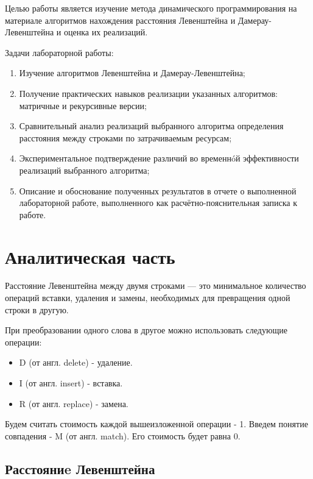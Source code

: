 \documentclass[12pt]{report}
\begin{document}
Целью работы является изучение метода динамического программирования на материале алгоритмов нахождения расстояния Левенштейна и Дамерау-Левенштейна и оценка их реализаций.
\newline

Задачи лабораторной работы:
\begin{enumerate}
  	\item Изучение алгоритмов Левенштейна и Дамерау-Левенштейна;
	\item Получение практических навыков реализации указанных алгоритмов: матричные и рекурсивные версии; 
	\item Сравнительный анализ реализаций выбранного алгоритма определения расстояния между строками по затрачиваемым ресурсам; 
	\item Экспериментальное подтверждение различий во временнóй эффективности 
	реализаций выбранного алгоритма; 
	\item Описание и обоснование полученных результатов в отчете о выполненной лабораторной
работе, выполненного как расчётно-пояснительная записка к работе. 
\end{enumerate}

\chapter{Аналитическая часть}

Расстояние Левенштейна \cite{Levenshtein} между двумя строками — это минимальное количество операций вставки, удаления и замены, необходимых для превращения одной строки в другую.


При преобразовании одного слова в другое можно использовать следующие
операции:

\begin{itemize}
	\item D (от англ. delete) - удаление.
	\item I (от англ. insert) - вставка.
	\item R (от англ. replace) - замена.
\end{itemize}

Будем считать стоимость каждой вышеизложенной операции - 1.
Введем понятие совпадения - M (от англ. match). Его стоимость будет равна
0.

\section{Расстояниe Левенштейна}
\end{document}
